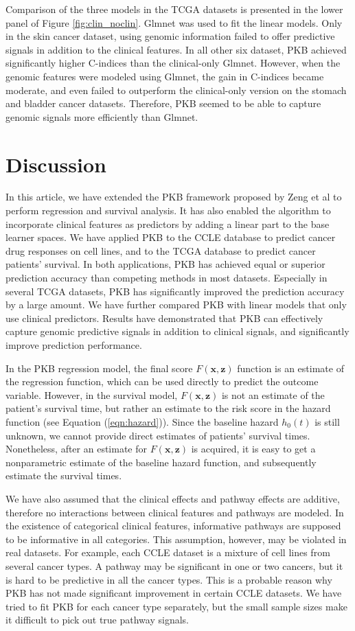 \documentclass[a4paper,12pt]{article}
\newcommand{\bd}[1]{\mathbf{#1}}
\begin{document}
Comparison of the three models in the TCGA datasets is presented in the lower panel of Figure \ref{fig:clin_noclin}. Glmnet was used to fit the linear models. Only in the skin cancer dataset, using genomic information failed to offer predictive signals in addition to the clinical features. In all other six dataset, PKB achieved significantly higher C-indices than the clinical-only Glmnet. However, when the genomic features were modeled using Glmnet, the gain in C-indices became moderate, and even failed to outperform the clinical-only version on the stomach and bladder cancer datasets. Therefore, PKB seemed to be able to capture genomic signals more efficiently than Glmnet.

\section{Discussion}
In this article, we have extended the PKB framework proposed by  Zeng et al\cite{zeng2019pathway} to perform regression and survival analysis. It has also enabled the algorithm to incorporate clinical features as predictors by adding a linear part to the base learner spaces. We have applied PKB to the CCLE database to predict cancer drug responses on cell lines, and to the TCGA database to predict cancer patients' survival. In both applications, PKB has achieved equal or superior prediction accuracy than competing methods in most datasets. Especially in several TCGA datasets, PKB has significantly improved the prediction accuracy by a large amount. We have further compared PKB with linear models that only use clinical predictors. Results have demonstrated that PKB can effectively capture genomic predictive signals in addition to clinical signals, and significantly improve prediction performance.

In the PKB regression model, the final score $F(\bd{x}, \bd{z})$ function is an estimate of the regression function, which can be used directly to predict the outcome variable. However, in the survival model, $F(\bd{x}, \bd{z})$ is not an estimate of the patient's survival time, but rather an estimate to the risk score in the hazard function (see Equation (\ref{eqn:hazard})). Since the baseline hazard $h_0(t)$ is still unknown, we cannot provide direct estimates of patients' survival times. Nonetheless, after an estimate for $F(\bd{x}, \bd{z})$ is acquired, it is easy to get a nonparametric estimate of the baseline hazard function, and subsequently estimate the survival times.

We have also assumed that the clinical effects and pathway effects are additive, therefore no interactions between clinical features and pathways are modeled. In the existence of categorical clinical features, informative pathways are supposed to be informative in all categories. This assumption, however, may be violated in real datasets. For example, each CCLE dataset is a mixture of cell lines from several cancer types. A pathway may be significant in one or two cancers, but it is hard to be predictive in all the cancer types. This is a probable reason why PKB has not made significant improvement in certain CCLE datasets. We have tried to fit PKB for each cancer type separately, but the small sample sizes make it difficult to pick out true pathway signals. 
\end{document}
